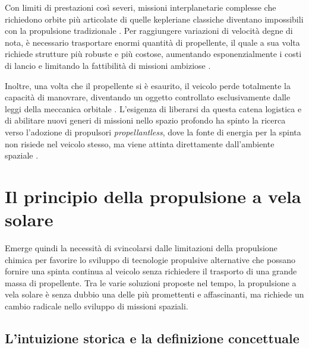 Con limiti di prestazioni così severi, missioni interplanetarie complesse che richiedono orbite più articolate di quelle kepleriane classiche diventano impossibili con la propulsione tradizionale \cite{mcconnell2023solarcruiser, macdonald2011applications}. Per raggiungere variazioni di velocità degne di nota, è necessario trasportare enormi quantità di propellente, il quale a sua volta richiede strutture più robuste e più costose, aumentando esponenzialmente i costi di lancio e limitando la fattibilità di missioni ambiziose \cite{johnson2012status}.

Inoltre, una volta che il propellente si è esaurito, il veicolo perde totalmente la capacità di manovrare, diventando un oggetto controllato esclusivamente dalle leggi della meccanica orbitale \cite{curtis2005orbital}. L'esigenza di liberarsi da questa catena logistica e di abilitare nuovi generi di missioni nello spazio profondo ha spinto la ricerca verso l'adozione di propulsori \textit{propellantless}, dove la fonte di energia per la spinta non risiede nel veicolo stesso, ma viene attinta direttamente dall'ambiente spaziale \cite{johnson2012status, urbanczyk1967solar, johnson2008overview}.


\section*{Il principio della propulsione a vela solare}

Emerge quindi la necessità di svincolarsi dalle limitazioni della propulsione chimica per favorire lo sviluppo di tecnologie propulsive alternative che possano fornire una spinta continua al veicolo senza richiedere il trasporto di una grande massa di propellente. Tra le varie soluzioni proposte nel tempo, la propulsione a vela solare è senza dubbio una delle più promettenti e affascinanti, ma richiede un cambio radicale nello sviluppo di missioni spaziali.


\subsection*{L'intuizione storica e la definizione concettuale}

